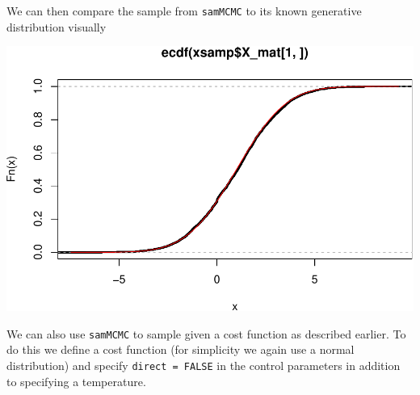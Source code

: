 \documentclass[]{article}
\newenvironment{Shaded}{\begin{snugshade}}{\end{snugshade}}
\newcommand{\DataTypeTok}[1]{\textcolor[rgb]{0.13,0.29,0.53}{#1}}
\newcommand{\DecValTok}[1]{\textcolor[rgb]{0.00,0.00,0.81}{#1}}
\newcommand{\KeywordTok}[1]{\textcolor[rgb]{0.13,0.29,0.53}{\textbf{#1}}}
\newcommand{\NormalTok}[1]{#1}
\newcommand{\OperatorTok}[1]{\textcolor[rgb]{0.81,0.36,0.00}{\textbf{#1}}}
\newcommand{\OtherTok}[1]{\textcolor[rgb]{0.56,0.35,0.01}{#1}}
\newcommand{\StringTok}[1]{\textcolor[rgb]{0.31,0.60,0.02}{#1}}
\begin{document}
We can then compare the sample from \texttt{samMCMC} to its known
generative distribution visually

\begin{Shaded}
\end{Shaded}

\includegraphics{replication_code_files/figure-latex/unnamed-chunk-3-1.pdf}

We can also use \texttt{samMCMC} to sample given a cost function as
described earlier. To do this we define a cost function (for simplicity
we again use a normal distribution) and specify
\texttt{direct\ =\ FALSE} in the control parameters in addition to
specifying a temperature.
\end{document}
